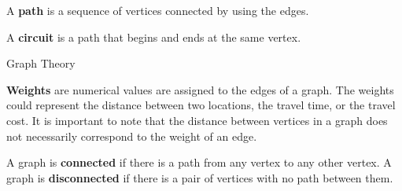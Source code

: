    \begin{frame}[fragile]
\begin{definition}[Path]
A \textbf{path} is a sequence of vertices connected by using the edges.
\end{definition}

\begin{definition}[Circuit]
A \textbf{circuit} is a path that begins and ends at the same vertex.
\end{definition}





\end{frame}

   \begin{frame}[fragile]{Graph Theory}

\begin{definition}[Weights]
\textbf{Weights} are numerical values are assigned to the edges of a graph.  The weights could represent the distance between two locations, the travel time, or the travel cost.  It is important to note that the distance between vertices in a graph does not necessarily correspond to the weight of an edge.
\end{definition}

\begin{definition}[Connected]
A graph is \textbf{connected} if there is a path from any vertex to any other vertex.  A graph is \textbf{disconnected} if there is a pair of vertices with no path between them.
\end{definition}



\end{frame}


